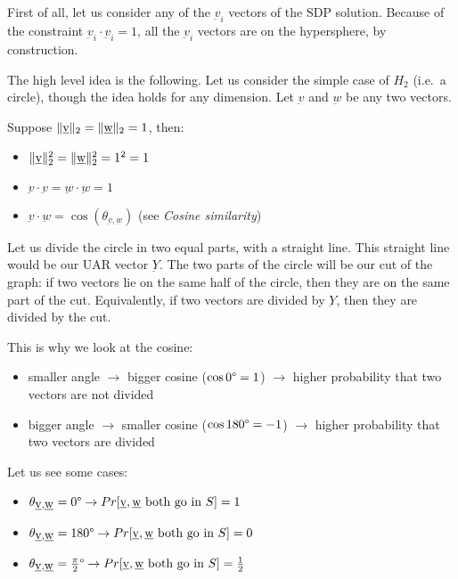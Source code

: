     First of all, let us consider any of the $\underbar{v}_i$ vectors of the SDP solution.
    Because of the constraint $\underbar{v}_i \cdot \underbar{v}_i = 1$, all the $\underbar{v}_i$ vectors are on the hypersphere, by construction.

    The high level idea is the following. Let us consider the simple case of $H_2$ (i.e.~a circle), though the idea holds for any dimension.
    Let $\underbar{v}$ and $\underbar{w}$ be any two vectors.
    
    Suppose $\lVert \underbar{v} \rVert_2 = \lVert \underbar{w} \rVert_2 = 1$, then:
    \begin{itemize}
        \item $\lVert \underbar{v} \rVert_2^2 = \lVert \underbar{w} \rVert_2^2 = 1^2 = 1$
        \item $\underbar{v} \cdot \underbar{v} = \underbar{w} \cdot \underbar{w} = 1$
        \item $\underbar{v} \cdot \underbar{w} = \cos (\theta_{\underbar{v}, \underbar{w}})$ (see \textit{Cosine similarity})
    \end{itemize}

    Let us divide the circle in two equal parts, with a straight line. This straight line would be our UAR vector $\underbar{Y}$.
    The two parts of the circle will be our cut of the graph: if two vectors lie on the same half of the circle, then they are on the same part of the cut.
    Equivalently, if two vectors are divided by $\underbar{Y}$, then they are divided by the cut.

    This is why we look at the cosine:
    \begin{itemize}
        \item smaller angle $\rightarrow$ bigger cosine ($\cos 0\degree = 1$) $\rightarrow$ higher probability that two vectors are not divided
        \item bigger angle $\rightarrow$ smaller cosine ($\cos 180\degree = -1$) $\rightarrow$ higher probability that two vectors are divided
    \end{itemize}
    
    Let us see some cases:
    \begin{itemize}
        \item $\theta_{\underbar{v},\underbar{w}} = 0\degree \rightarrow Pr[\underbar{v},\underbar{w} \text{ both go in } S] = 1$
        \item $\theta_{\underbar{v},\underbar{w}} = 180\degree \rightarrow Pr[\underbar{v},\underbar{w} \text{ both go in } S] = 0$
        \item $\theta_{\underbar{v},\underbar{w}} = \frac{\pi}{2}\degree \rightarrow Pr[\underbar{v},\underbar{w} \text{ both go in } S] = \frac{1}{2}$
    \end{itemize}

